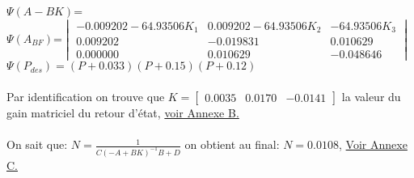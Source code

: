 		\begin{center}
					
			$\Psi(A-BK)$=\\$\Psi(A_{BF})$=$\begin{vmatrix}
			-0.009202-64.93506K_1&0.009202-64.93506K_2&-64.93506K_3\\
			0.009202&-0.019831&0.010629\\
			 0.000000&0.010629&-0.048646
			\end{vmatrix}$\\[1.5cm]
			
			$\Psi(P_{des})=(P+0.033)(P+0.15)(P+0.12)$			
			
		\end{center}
		
		\paragraph{} Par identification on trouve que $K=\begin{bmatrix} 0.0035&0.0170&-0.0141\end{bmatrix}$ la valeur du gain matriciel du retour d'état,\label{K} \hyperref[Annexe B]{voir Annexe B.}\\
		
		\paragraph{} On sait que: $N=\frac{1}{C(-A+BK)^{-1}B+D}$ on obtient au final: $N=0.0108$,\label{N} \hyperref[Annexe C]{Voir Annexe C.}
		
		